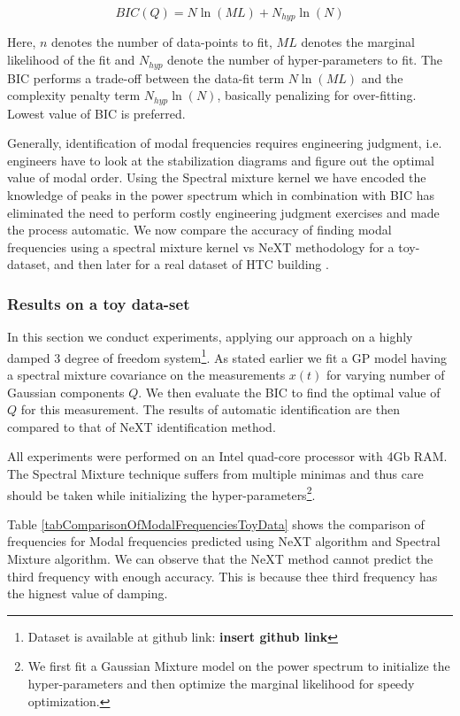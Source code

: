 \begin{mdframed}[hidealllines=true,backgroundcolor=blue!20]
\begin{equation}\label{eq:BIC}
    BIC(Q) = N\ln(ML) + N_{hyp}\ln(N)
\end{equation}

Here, $n$ denotes the number of data-points to fit, $ML$ denotes the marginal likelihood of the fit and $N_{hyp}$ denote the number of hyper-parameters to fit. The BIC performs a trade-off between the data-fit term $N\ln(ML)$ and the complexity penalty term $N_{hyp}\ln(N)$, basically penalizing for over-fitting. Lowest value of BIC is preferred. 
\end{mdframed}


Generally, identification of modal frequencies requires engineering judgment, i.e. engineers have to look at the stabilization diagrams and figure out the optimal value of modal order. Using the Spectral mixture kernel we have encoded the knowledge of peaks in the power spectrum which in combination with BIC has eliminated the need to perform costly engineering judgment exercises and made the process automatic. We now compare the accuracy of finding modal frequencies using a spectral mixture kernel vs NeXT methodology for a toy-dataset, and then later for a real dataset of HTC building \cite{brincker2000modal}.

\subsubsection{Results on a toy data-set}
In this section we conduct experiments, applying our approach on a highly damped 3 degree of freedom system\footnote{Dataset is available at github link: \textbf{insert github link}}. As stated earlier we fit a GP model having a spectral mixture covariance on the measurements $x(t)$ for varying number of Gaussian components $Q$. We then evaluate the BIC to find the optimal value of $Q$ for this measurement. The results of automatic identification are then compared to that of NeXT identification method. 

All experiments were performed on an Intel quad-core processor with 4Gb RAM. The Spectral Mixture technique suffers from multiple minimas and thus care should be taken while initializing the hyper-parameters\footnote{We first fit a Gaussian Mixture model on the power spectrum to initialize the hyper-parameters and then optimize the marginal likelihood for speedy optimization.}.  

Table \ref{tabComparisonOfModalFrequenciesToyData} shows the comparison of frequencies for Modal frequencies predicted using NeXT algorithm and Spectral Mixture algorithm. We can observe that the NeXT method cannot predict the third frequency with enough accuracy. This is because thee third frequency has the hignest value of damping.

